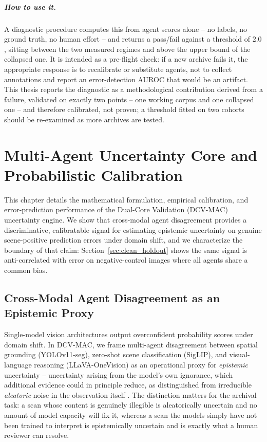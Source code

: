\documentclass[12pt,a4paper]{report}
\begin{document}
\paragraph{How to use it.} A diagnostic procedure computes this from agent scores alone -- no labels, no ground truth, no human effort -- and returns a pass/fail against a threshold of $2.0$, sitting between the two measured regimes and above the upper bound of the collapsed one. It is intended as a pre-flight check: if a new archive fails it, the appropriate response is to recalibrate or substitute agents, not to collect annotations and report an error-detection AUROC that would be an artifact. This thesis reports the diagnostic as a methodological contribution derived from a failure, validated on exactly two points -- one working corpus and one collapsed one -- and therefore calibrated, not proven; a threshold fitted on two cohorts should be re-examined as more archives are tested.

\chapter{Multi-Agent Uncertainty Core and Probabilistic Calibration}
\label{ch:uncertainty_calibration}

This chapter details the mathematical formulation, empirical calibration, and error-prediction performance of the Dual-Core Validation (DCV-MAC) uncertainty engine. We show that cross-modal agent disagreement provides a discriminative, calibratable signal for estimating epistemic uncertainty on genuine scene-positive prediction errors under domain shift, and we characterize the boundary of that claim: Section~\ref{sec:clean_holdout} shows the same signal is anti-correlated with error on negative-control images where all agents share a common bias.

\section{Cross-Modal Agent Disagreement as an Epistemic Proxy}
Single-model vision architectures output overconfident probability scores under domain shift. In DCV-MAC, we frame multi-agent disagreement between spatial grounding (YOLOv11-seg), zero-shot scene classification (SigLIP), and visual-language reasoning (LLaVA-OneVision) as an operational proxy for \emph{epistemic} uncertainty -- uncertainty arising from the model's own ignorance, which additional evidence could in principle reduce, as distinguished from irreducible \emph{aleatoric} noise in the observation itself \cite{kendall2017uncertainties}. The distinction matters for the archival task: a scan whose content is genuinely illegible is aleatorically uncertain and no amount of model capacity will fix it, whereas a scan the models simply have not been trained to interpret is epistemically uncertain and is exactly what a human reviewer can resolve.
\end{document}
